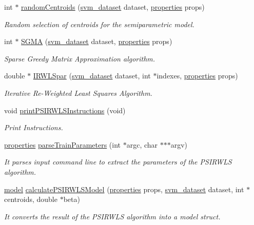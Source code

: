 \begin{DoxyCompactItemize}
\item 
int $\ast$ \hyperlink{PSIRWLS-train_8h_aa6c8aa8b86b7a0647cc679408c310cd3}{random\+Centroids} (\hyperlink{structsvm__dataset}{svm\+\_\+dataset} dataset, \hyperlink{structproperties}{properties} props)
\begin{DoxyCompactList}\small\item\em Random selection of centroids for the semiparametric model. \end{DoxyCompactList}\item 
int $\ast$ \hyperlink{PSIRWLS-train_8h_a50a6e1f36a010feb91db9b9b38679948}{S\+G\+MA} (\hyperlink{structsvm__dataset}{svm\+\_\+dataset} dataset, \hyperlink{structproperties}{properties} props)
\begin{DoxyCompactList}\small\item\em Sparse Greedy Matrix Approximation algorithm. \end{DoxyCompactList}\item 
double $\ast$ \hyperlink{PSIRWLS-train_8h_ad51d9a46645ad0b0bedb1113a3807d24}{I\+R\+W\+L\+Spar} (\hyperlink{structsvm__dataset}{svm\+\_\+dataset} dataset, int $\ast$indexes, \hyperlink{structproperties}{properties} props)
\begin{DoxyCompactList}\small\item\em Iterative Re-\/\+Weighted Least Squares Algorithm. \end{DoxyCompactList}\item 
void \hyperlink{PSIRWLS-train_8h_a0a24887780df491bc4ea2f590a2198f7}{print\+P\+S\+I\+R\+W\+L\+S\+Instructions} (void)
\begin{DoxyCompactList}\small\item\em Print Instructions. \end{DoxyCompactList}\item 
\hyperlink{structproperties}{properties} \hyperlink{PSIRWLS-train_8h_a67566f6fd6aec7278ca360186af4e91b}{parse\+Train\+Parameters} (int $\ast$argc, char $\ast$$\ast$$\ast$argv)
\begin{DoxyCompactList}\small\item\em It parses input command line to extract the parameters of the P\+S\+I\+R\+W\+LS algorithm. \end{DoxyCompactList}\item 
\hyperlink{structmodel}{model} \hyperlink{PSIRWLS-train_8h_a71b4329438bbf3210414315619f7b804}{calculate\+P\+S\+I\+R\+W\+L\+S\+Model} (\hyperlink{structproperties}{properties} props, \hyperlink{structsvm__dataset}{svm\+\_\+dataset} dataset, int $\ast$centroids, double $\ast$beta)
\begin{DoxyCompactList}\small\item\em It converts the result of the P\+S\+I\+R\+W\+LS algorithm into a model struct. \end{DoxyCompactList}\end{DoxyCompactItemize}


